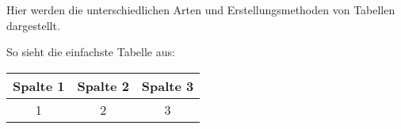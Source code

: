 \documentclass[a4paper, 12pt]{article}
\begin{document}
Hier werden die unterschiedlichen Arten und Erstellungsmethoden von Tabellen dargestellt.

So sieht die einfachste Tabelle aus:

\begin{tabular}{|c|c|c|}
\hline
Spalte 1 & Spalte 2 & Spalte 3 \\
\hline
1 & 2 & 3 \\
\hline
\end{tabular}
\end{document}
